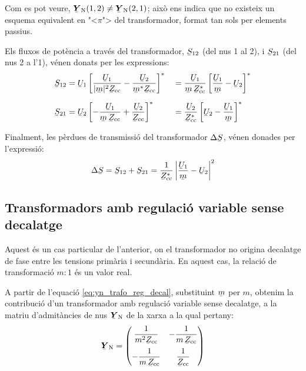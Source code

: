 Com es pot veure, $\mcmplx{Y}\ped{N}(1,2) \neq
\mcmplx{Y}\ped{N}(2,1)$; aix\`{o} ens indica que no existeix un esquema
equivalent en {"<}$\pi${">} del transformador, format tan sols per
elements passius.

Els fluxos de pot\`{e}ncia a trav\'{e}s del transformador, $\cmplx{S}_{12}$
(del nus 1 al 2), i $\cmplx{S}_{21}$ (del nus 2 a l'1), v\'{e}nen donats
per les expressions: 
\begin{alignat}{2}
   \cmplx{S}_{12} &= \cmplx{U}_1 \left[ \frac{\cmplx{U}_1}{|\cmplx{m}|^2 \cmplx{Z}\ped{cc}} - \frac{\cmplx{U}_2}{\cmplx{m}^* \cmplx{Z}\ped{cc}} \right]^* &&= \frac{\cmplx{U}_1}{\cmplx{m}\, \cmplx{Z}\ped{cc}^*} \left[ \frac{\cmplx{U}_1}{\cmplx{m}} - \cmplx{U}_2 \right]^* \label{eq:s12_trafo_reg_decal} \\[1.5ex]
   \cmplx{S}_{21} &= \cmplx{U}_2 \left[ - \frac{\cmplx{U}_1}{\cmplx{m} \,\cmplx{Z}\ped{cc}} + \frac{\cmplx{U}_2} {\cmplx{Z}\ped{cc}} \right]^* &&= \frac{\cmplx{U}_2}{\cmplx{Z}\ped{cc}^*} \left[  \cmplx{U}_2 - \frac{\cmplx{U}_1}{\cmplx{m}}  \right]^* \label{eq:s21_trafo_reg_decal}
\end{alignat}

Finalment, les p\`{e}rdues de transmissi\'{o} del transformador
$\Delta\cmplx{S}$, v\'{e}nen donades per l'expressi\'{o}:
\begin{equation} \label{eq:ds_trafo_reg_decal}
   \Delta\cmplx{S} = \cmplx{S}_{12} + \cmplx{S}_{21} = \frac{1}{\cmplx{Z}\ped{cc}^*}  \left|
    \frac{\cmplx{U}_1}{\cmplx{m}} - \cmplx{U}_2 \right|^2
\end{equation}


\subsection{Transformadors amb regulaci\'{o} variable sense decalatge} \label{sec:trafo_reg}

Aquest \'{e}s un cas particular de l'anterior, on el transformador no
origina decalatge de fase entre les tensions prim\`{a}ria i secund\`{a}ria.
En aquest cas, la relaci\'{o} de transformaci\'{o} $m : 1$ \'{e}s un valor real.

A partir de l'equaci\'{o}  \eqref{eq:yn_trafo_reg_decal}, substituint
$\cmplx{m}$ per $m$, obtenim la contribuci\'{o} d'un transformador amb
regulaci\'{o} variable sense decalatge, a la matriu d'admit\`{a}ncies de nus
$\mcmplx{Y}\ped{N}$ de la xarxa a la qual pertany:
\begin{equation}
   \mcmplx{Y}\ped{N} = \begin{pmatrix}
     \dfrac{1}{m^2 \cmplx{Z}\ped{cc}} & - \dfrac{1}{m \,\cmplx{Z}\ped{cc}} \\[2.5ex]
     - \dfrac{1}{m \,\cmplx{Z}\ped{cc}} & \dfrac{1}{\cmplx{Z}\ped{cc}}
   \end{pmatrix}
\end{equation}


